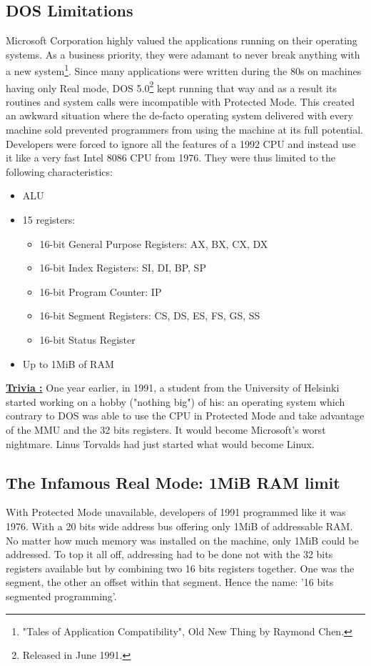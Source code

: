 \documentclass[book.tex]{subfiles}
\begin{document}
  \subsection{DOS Limitations}
  Microsoft Corporation highly valued the applications running on their operating systems. As a business priority, they were adamant to never break anything with a new system\footnote{"Tales of Application Compatibility", Old New Thing by Raymond Chen.}.  Since many applications were written during the 80s on machines having only Real mode, DOS 5.0\footnote{Released in June 1991.} kept running that way and as a result its routines and system calls were incompatible with Protected Mode. This created an awkward situation where the de-facto operating system delivered with every machine sold prevented programmers from using the machine at its full potential. Developers were forced to ignore all the features of a 1992 CPU and instead use it like a very fast Intel 8086 CPU from 1976. They were thus limited to the following characteristics: \\
\begin{itemize}
\item ALU
\item 15 registers:
\begin{itemize}
  \item 16-bit General Purpose Registers: AX, BX, CX, DX
  \item 16-bit Index Registers: SI, DI, BP, SP
  \item 16-bit Program Counter: IP
  \item 16-bit Segment Registers: CS, DS, ES, FS, GS, SS
  \item 16-bit Status Register
\end{itemize}
\item Up to 1MiB of RAM
\end{itemize}


\bigskip

 \textbf{\underline{Trivia :}} One year earlier, in 1991, a student from the University of Helsinki started working on a hobby ("nothing big") of his: an operating system which contrary to DOS was able to use the CPU in Protected Mode and take advantage of the MMU and the 32 bits registers. It would become Microsoft's worst nightmare. Linus Torvalds had just started what would become Linux.



  \subsection{The Infamous Real Mode: 1MiB RAM limit}
  With Protected Mode unavailable, developers of 1991 programmed like it was 1976. With a 20 bits wide address bus offering only 1MiB of addressable RAM. No matter how much memory was installed on the machine, only 1MiB could be addressed. To top it all off, addressing had to be done not with the 32 bits registers available but by combining two 16 bits registers together. One was the segment, the other an offset within that segment. Hence the name: '16 bits segmented programming'.
\end{document}
